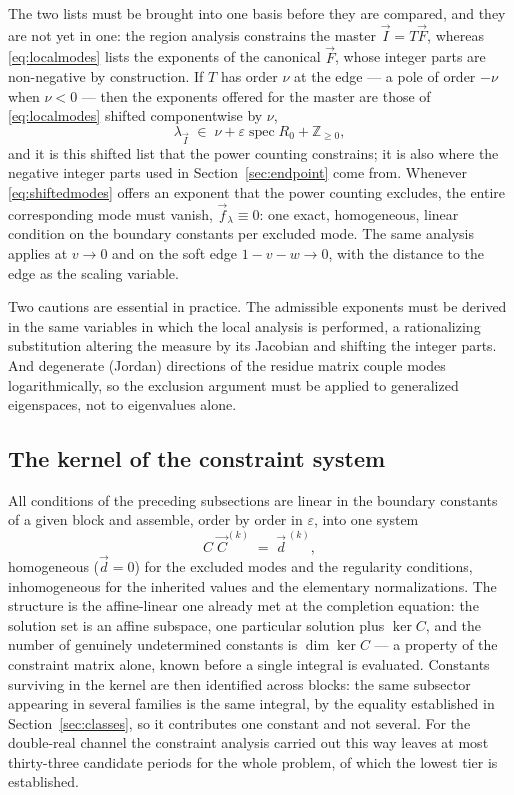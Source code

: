 \documentclass[11pt]{article}
\newcommand{\eps}{\varepsilon}
\newcommand{\Z}{\mathbb{Z}}
\begin{document}
The two lists must be brought into one basis before they are compared,
and they are not yet in one: the region analysis constrains the master
$\vec I = T \vec F$, whereas \eqref{eq:localmodes} lists the exponents
of the canonical $\vec F$, whose integer parts are non-negative by
construction.  If $T$ has order $\nu$ at the edge --- a pole of order
$-\nu$ when $\nu < 0$ --- then the exponents offered for the master are
those of \eqref{eq:localmodes} shifted componentwise by $\nu$,
\begin{equation}
  \lambda_{\vec I} \;\in\;
  \nu + \eps\operatorname{spec}R_0 + \Z_{\ge0} ,
  \label{eq:shiftedmodes}
\end{equation}
and it is this shifted list that the power counting constrains; it is
also where the negative integer parts used in
Section~\ref{sec:endpoint} come from.  Whenever \eqref{eq:shiftedmodes}
offers an exponent that the power counting excludes, the entire
corresponding mode must vanish, $\vec f_{\lambda} \equiv 0$: one exact,
homogeneous, linear condition on the boundary constants per excluded
mode.  The same analysis applies at $v \to 0$ and on the soft edge
$1 - v - w \to 0$, with the distance to the edge as the scaling
variable.

Two cautions are essential in practice.  The admissible exponents must
be derived in the same variables in which the local analysis is
performed, a rationalizing substitution altering the measure by its
Jacobian and shifting the integer parts.  And degenerate (Jordan)
directions of the residue matrix couple modes logarithmically, so the
exclusion argument must be applied to generalized eigenspaces, not to
eigenvalues alone.

\subsection{The kernel of the constraint system}
\label{sec:kernel}

All conditions of the preceding subsections are linear in the
boundary constants of a given block and assemble, order by order in
$\eps$, into one system
\begin{equation}
  C\;\vec C^{(k)} \;=\; \vec d^{\,(k)} ,
\end{equation}
homogeneous ($\vec d = 0$) for the excluded modes and the regularity
conditions, inhomogeneous for the inherited values and the elementary
normalizations.  The structure is the affine-linear one already met at
the completion equation: the solution set is an affine subspace, one
particular solution plus $\ker C$, and the number of genuinely
undetermined constants is $\dim\ker C$ --- a property of the
constraint matrix alone, known before a single integral is
evaluated.  Constants surviving in the kernel are then
identified across blocks: the same subsector appearing in several
families is the same integral, by the equality established in
Section~\ref{sec:classes}, so it contributes one constant and not
several.  For the double-real channel the constraint analysis carried
out this way leaves at most thirty-three candidate periods for the
whole problem, of which the lowest tier is established.
\end{document}
